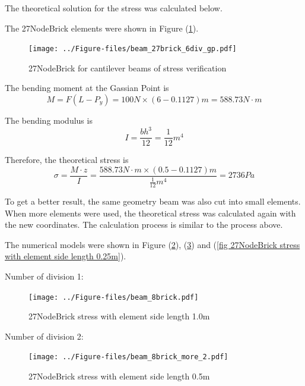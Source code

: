 \documentclass[fleqn,11pt]{article}
\begin{document}
The theoretical solution for the stress was calculated below. 





The 27NodeBrick elements were shown in Figure (\ref{fig 27NodeBrick for cantilever beams of stress verification}).

\begin{figure}[H]
  \centering
  \texttt{[image: ../Figure-files/beam\_27brick\_6div\_gp.pdf]}
  \caption{27NodeBrick for cantilever beams of stress verification}
  \label{fig 27NodeBrick for cantilever beams of stress verification}
\end{figure}

The bending moment at the Gassian Point is 
\begin{equation}
  M=F(L-P_y)=100 N \times (6-0.1127) m = 588.73 N\cdot m
\end{equation}

The bending modulus is 
\begin{equation}
  I= \frac{bh^3}{12}=\frac{1}{12} m^4
\end{equation}

Therefore, the theoretical stress is 
\begin{equation}
  \sigma= \frac{M\cdot z}{I}= \frac{588.73 N\cdot m \times (0.5-0.1127) m }{\frac{1}{12} m^4}= 2736 Pa
\end{equation}



To get a better result, the same geometry beam was also cut into small elements. When more elements were used, the theoretical stress was calculated again with the new coordinates. The calculation process is similar to the process above. 


The numerical models were shown in Figure (\ref{fig 27NodeBrick stress with element side length 1.0m}), (\ref{fig 27NodeBrick stress with element side length 0.5m}) and (\ref{fig 27NodeBrick stress with element side length 0.25m}). 


Number of division 1:

\begin{figure}[H]
  \centering
  \texttt{[image: ../Figure-files/beam\_8brick.pdf]}
  \caption{27NodeBrick stress with element side length 1.0m}
  \label{fig 27NodeBrick stress with element side length 1.0m}
\end{figure}

Number of division 2:

\begin{figure}[H]
  \centering
  \texttt{[image: ../Figure-files/beam\_8brick\_more\_2.pdf]}
  \caption{27NodeBrick stress with element side length 0.5m}
  \label{fig 27NodeBrick stress with element side length 0.5m}
\end{figure}
\end{document}
